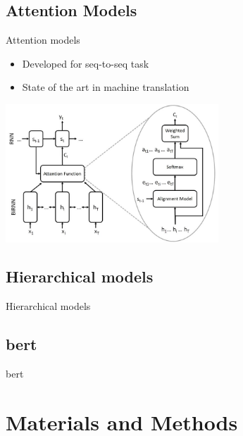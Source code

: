 \subsection{Attention Models}

\begin{frame}{Attention models}
  \begin{itemize}
  \item Developed for seq-to-seq task
  \item State of the art in machine translation
  \end{itemize}
  \begin{center}
    \includegraphics[width=0.6\textwidth]{img/attention.jpg}
  \end{center}  
\end{frame}

\subsection{Hierarchical models}
\begin{frame}{Hierarchical models}
  
\end{frame}

\subsection{\acs{bert}}
\begin{frame}{\acf{bert}}
  
\end{frame}

\section{Materials and Methods}

